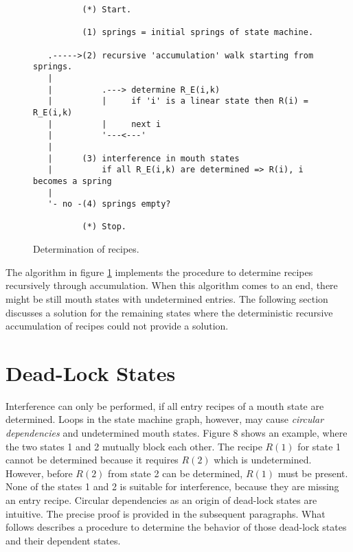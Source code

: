 \documentclass[12pt,a4paper]{scrartcl}
\begin{document}
\begin{figure}[htbp] \leavevmode \label{fig:algo-1}
\begin{verbatim}
          (*) Start.
   
          (1) springs = initial springs of state machine.

   .----->(2) recursive 'accumulation' walk starting from springs.
   |
   |          .---> determine R_E(i,k) 
   |          |     if 'i' is a linear state then R(i) = R_E(i,k)
   |          |     next i
   |          '---<---'
   |
   |      (3) interference in mouth states 
   |          if all R_E(i,k) are determined => R(i), i becomes a spring
   |
   '- no -(4) springs empty?

          (*) Stop.
\end{verbatim}

\caption{Determination of recipes.}
\end{figure}

The algorithm in figure \ref{fig:algo-1} implements the procedure to determine
recipes recursively through accumulation.  When this algorithm comes to an end,
there might be still mouth states with undetermined entries.  The following
section discusses a solution for the remaining states where the deterministic
recursive accumulation of recipes could not provide a solution.



%
\section{Dead-Lock States}

Interference can only be performed, if all entry recipes of a mouth state are
determined. Loops in the state machine graph, however, may cause
\textit{circular dependencies} and undetermined mouth states.  Figure 8 shows
an example, where the two states 1 and 2 mutually block each other. The recipe
$R(1)$ for state 1 cannot be determined because it requires $R(2)$ which is
undetermined. However, before $R(2)$ from state 2 can be determined, $R(1)$
must be present. None of the states 1 and 2 is suitable for interference,
because they are missing an entry recipe.  Circular dependencies as an origin
of dead-lock states are intuitive. The precise proof is provided in the
subsequent paragraphs. What follows describes a procedure to determine the
behavior of those dead-lock states and their dependent states.
\end{document}
